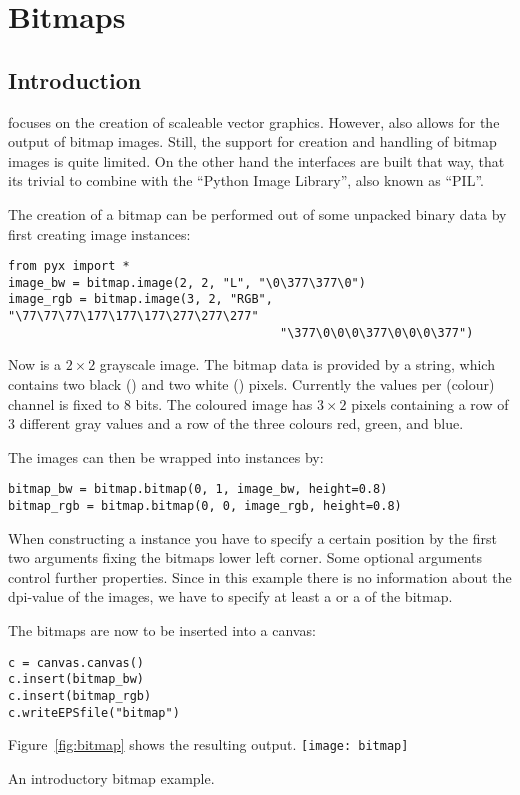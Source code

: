 \chapter{Bitmaps}
\section{Introduction}
\PyX{} focuses on the creation of scaleable vector graphics. However,
\PyX{} also allows for the output of bitmap images. Still, the support
for creation and handling of bitmap images is quite limited. On the
other hand the interfaces are built that way, that its trivial to
combine \PyX{} with the ``Python Image Library'', also known as
``PIL''.

The creation of a bitmap can be performed out of some unpacked binary
data by first creating image instances:
\begin{verbatim}
from pyx import *
image_bw = bitmap.image(2, 2, "L", "\0\377\377\0")
image_rgb = bitmap.image(3, 2, "RGB", "\77\77\77\177\177\177\277\277\277"
                                      "\377\0\0\0\377\0\0\0\377")
\end{verbatim}
Now  is a $2\times2$ grayscale image. The bitmap data
is provided by a string, which contains two black () and two white () pixels. Currently
the values per (colour) channel is fixed to 8 bits. The coloured image
 has $3\times2$ pixels containing a row of 3 different
gray values and a row of the three colours red, green, and blue.

The images can then be wrapped into  instances by:
\begin{verbatim}
bitmap_bw = bitmap.bitmap(0, 1, image_bw, height=0.8)
bitmap_rgb = bitmap.bitmap(0, 0, image_rgb, height=0.8)
\end{verbatim}
When constructing a  instance you have to specify a
certain position by the first two arguments fixing the bitmaps lower
left corner. Some optional arguments control further properties. Since
in this example there is no information about the dpi-value of the
images, we have to specify at least a  or a 
of the bitmap.

The bitmaps are now to be inserted into a canvas:
\begin{verbatim}
c = canvas.canvas()
c.insert(bitmap_bw)
c.insert(bitmap_rgb)
c.writeEPSfile("bitmap")
\end{verbatim}
Figure~\ref{fig:bitmap} shows the resulting output.
\texttt{[image: bitmap]}
\centerline{An introductory bitmap example.}

